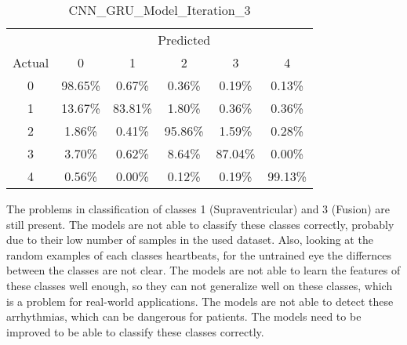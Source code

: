 \begin{table}[ht]
\begin{minipage}{0.32\textwidth}
        \caption*{CNN\_GRU\_Model\_Iteration\_3}
        \begin{tabular}{cccccc}
            \toprule
            & \multicolumn{5}{c}{Predicted} \\
            \cmidrule(lr){2-6}
            Actual & 0 & 1 & 2 & 3 & 4 \\
            \midrule
            0 & 98.65\% & 0.67\% & 0.36\% & 0.19\% & 0.13\% \\
            1 & 13.67\% & 83.81\% & 1.80\% & 0.36\% & 0.36\% \\
            2 & 1.86\%  & 0.41\% & 95.86\% & 1.59\% & 0.28\% \\
            3 & 3.70\%  & 0.62\% & 8.64\%  & 87.04\% & 0.00\% \\
            4 & 0.56\%  & 0.00\% & 0.12\%  & 0.19\% & 99.13\% \\
            \bottomrule
        \end{tabular}
    \end{minipage}
\end{table}

The problems in classification of classes 1 (Supraventricular) and 3 (Fusion) are still present. The models are not able to classify these classes correctly, probably due to their low number of samples in the used dataset. Also, looking at the random examples of each classes heartbeats, for the untrained eye the differnces between the classes are not clear. 
The models are not able to learn the features of these classes well enough, so they can not generalize well on these classes, which is a problem for real-world applications. The models are not able to detect these arrhythmias, which can be dangerous for patients. The models need to be improved to be able to classify these classes correctly. 